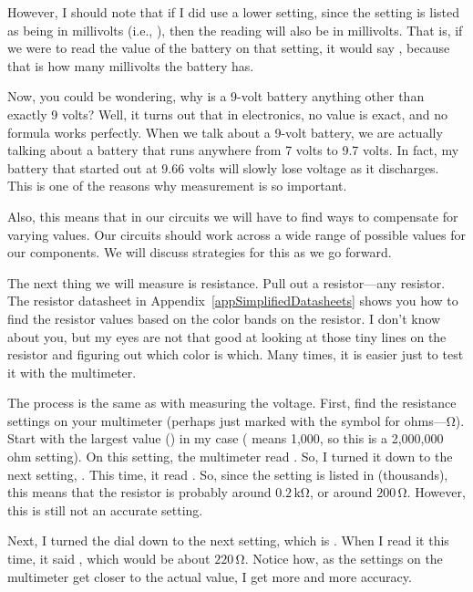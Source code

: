However, I should note that if I did use a lower setting, since the setting is listed as being in millivolts (i.e., ), then the reading will also be in millivolts.  
That is, if we were to read the value of the battery on that setting, it would say , because that is how many millivolts the battery has.

Now, you could be wondering, why is a 9-volt battery anything other than exactly 9 volts?
Well, it turns out that in electronics, no value is exact, and no formula works perfectly.
When we talk about a 9-volt battery, we are actually talking about a battery that runs anywhere from 7 volts to 9.7 volts.
In fact, my battery that started out at 9.66 volts will slowly lose voltage as it discharges.
This is one of the reasons why measurement is so important.

Also, this means that in our circuits we will have to find ways to compensate for varying values.
Our circuits should work across a wide range of possible values for our components.
We will discuss strategies for this as we go forward.

The next thing we will measure is resistance.
Pull out a resistor---any resistor.
The resistor datasheet in Appendix~\ref{appSimplifiedDatasheets} shows you how to find the resistor values based on the color bands on the resistor.
I don't know about you, but my eyes are not that good at looking at those tiny lines on the resistor and figuring out which color is which.
Many times, it is easier just to test it with the multimeter.

The process is the same as with measuring the voltage.
First, find the resistance settings on your multimeter (perhaps just marked with the symbol for ohms---\si{\ohm}).
Start with the largest value () in my case ( means 1,000, so this is a 2,000,000 ohm setting).
On this setting, the multimeter read .
So, I turned it down to the next setting, .  
This time, it read .
So, since the setting is listed in  (thousands), this means that the resistor is probably around $0.2\,\si{\kilo\ohm}$, or around $200\,\si{\ohm}$.
However, this is still not an accurate setting.

Next, I turned the dial down to the next setting, which is .
When I read it this time, it said , which would be about $220\,\si{\ohm}$.
Notice how, as the settings on the multimeter get closer to the actual value, I get more and more accuracy.

